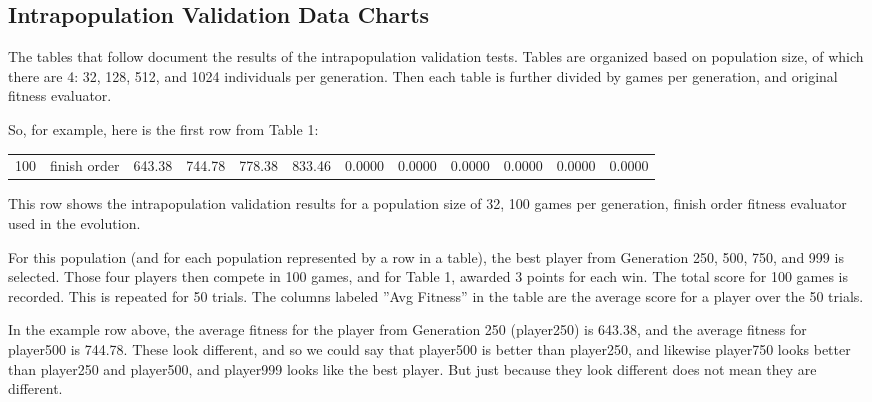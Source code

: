 \clearpage
\begin{landscape}
\newpage
\chapter{Intrapopulation Validation Data Charts}
\label{appendix:intravalidation}

The tables that follow document the results of the intrapopulation validation
tests. Tables are organized based on population size, of which there are 4: 32,
128, 512, and 1024 individuals per generation. Then each table is further
divided by games per generation, and original fitness evaluator.

So, for example, here is the first row from Table 1:

\begin{table}[ht]
  \centering
    \begin{tabularx}{\linewidth}{|p{1in}|p{1in}|r|r|r|r|r|r|r|r|r|r|}
 \cline{1-12}
      \multirow{1}{*}{100} & finish order & 643.38 & 744.78 & 778.38 & 833.46 & 0.0000 & 0.0000 & 0.0000 & 0.0000 & 0.0000 & 0.0000 \\
 \cline{1-12}
    \end{tabularx}%
\end{table}%

This row shows the intrapopulation validation results for a population size of
32, 100 games per generation, finish order fitness evaluator used in the
evolution.

For this population (and for each population represented by a row in a table),
the best player from Generation 250, 500, 750, and 999 is selected. Those four
players then compete in 100 games, and for Table 1, awarded 3 points for each 
win. The total score for 100 games is recorded. This is repeated for 50 trials.
The columns labeled ''Avg Fitness'' in the table are the average score for a
player over the 50 trials.

In the example row above, the average fitness for the player from Generation 250
(player250) is 643.38, and the average fitness for player500 is 744.78. These
look different, and so we could say that player500 is better than player250, and
likewise player750 looks better than player250 and player500, and player999 looks
like the best player. But just because they look different does not mean they
are different.


\end{landscape}
